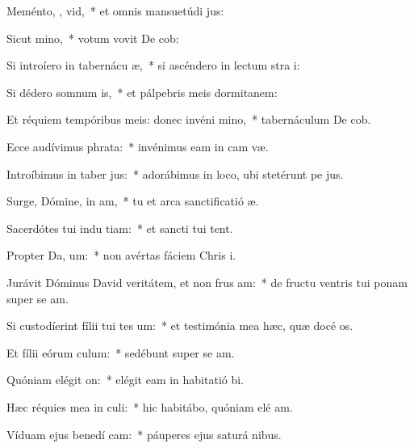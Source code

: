 \item Meménto, , vid,~* et omnis mansuetúdi jus:
\item Sicut  mino,~* votum vovit De cob:
\item Si introíero in tabernácu  æ,~* si ascéndero in lectum stra i:
\item Si dédero somnum  is,~* et pálpebris meis dormitanem:
\item Et réquiem tempóribus meis: donec invéni  mino,~* tabernáculum De cob.
\item Ecce audívimus   phrata:~* invénimus eam in cam væ.
\item Introíbimus in taber jus:~* adorábimus in loco, ubi stetérunt pe jus.
\item Surge, Dómine, in  am,~* tu et arca sanctificatió æ.
\item Sacerdótes tui indu tiam:~* et sancti tui tent.
\item Propter Da,  um:~* non avértas fáciem Chris i.
\item Jurávit Dóminus David veritátem, et non frus am:~* de fructu ventris tui ponam super se am.
\item Si custodíerint fílii tui tes um:~* et testimónia mea hæc, quæ docé os.
\item Et fílii eórum   culum:~* sedébunt super se am.
\item Quóniam elégit  on:~* elégit eam in habitatió bi.
\item Hæc réquies mea in  culi:~* hic habitábo, quóniam elé am.
\item Víduam ejus benedí cam:~* páuperes ejus saturá nibus.
